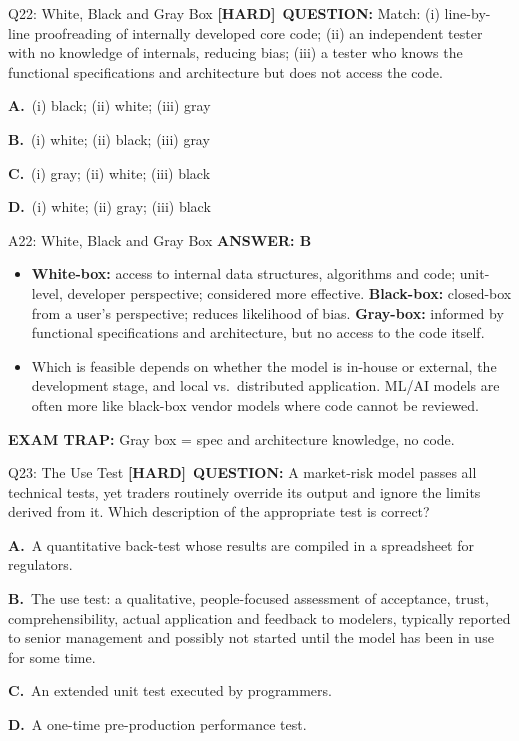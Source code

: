\documentclass[8pt]{beamer}
\newcommand{\fs}{\fontsize{10}{12}\selectfont}
\newcommand{\opts}[4]{\par\vspace{0.12cm}\noindent\textbf{A.}~#1\par\vspace{0.08cm}\noindent\textbf{B.}~#2\par\vspace{0.08cm}\noindent\textbf{C.}~#3\par\vspace{0.08cm}\noindent\textbf{D.}~#4\par}
\newcommand{\ans}[1]{\textcolor{myblue}{\textbf{ANSWER: #1}}}
\newcommand{\trap}[1]{\textcolor{myred}{\textbf{EXAM TRAP:}} #1}
\newcommand{\hard}{\textcolor{myorange}{\textbf{[HARD]}}}
\begin{document}
\begin{frame}[t]{Q22: White, Black and Gray Box}
\fs
\hard\ \textbf{QUESTION:} Match: (i) line-by-line proofreading of internally developed core code; (ii) an independent tester with no knowledge of internals, reducing bias; (iii) a tester who knows the functional specifications and architecture but does not access the code.
\opts{(i) black; (ii) white; (iii) gray}
{(i) white; (ii) black; (iii) gray}
{(i) gray; (ii) white; (iii) black}
{(i) white; (ii) gray; (iii) black}
\end{frame}

\begin{frame}[t]{A22: White, Black and Gray Box}
\fs
\ans{B}
\begin{itemize}
\item \textbf{White-box:} access to internal data structures, algorithms and code; unit-level, developer perspective; considered more effective. \textbf{Black-box:} closed-box from a user's perspective; reduces likelihood of bias. \textbf{Gray-box:} informed by functional specifications and architecture, but no access to the code itself.
\item Which is feasible depends on whether the model is in-house or external, the development stage, and local vs.\ distributed application. ML/AI models are often more like black-box vendor models where code cannot be reviewed.
\end{itemize}
\trap{Gray box = \textcolor{myblue}{spec and architecture knowledge, no code}.}
\end{frame}

\begin{frame}[t]{Q23: The Use Test}
\fs
\hard\ \textbf{QUESTION:} A market-risk model passes all technical tests, yet traders routinely override its output and ignore the limits derived from it. Which description of the appropriate test is correct?
\opts{A quantitative back-test whose results are compiled in a spreadsheet for regulators.}
{The use test: a qualitative, people-focused assessment of acceptance, trust, comprehensibility, actual application and feedback to modelers, typically reported to senior management and possibly not started until the model has been in use for some time.}
{An extended unit test executed by programmers.}
{A one-time pre-production performance test.}
\end{frame}
\end{document}
